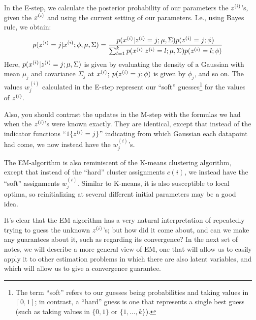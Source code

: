 \documentclass{article}
\begin{document}
In the E-step, we calculate the posterior probability of our parameters
the ${z^{(i)}}$'s, given the ${x^{(i)}}$ and using the current setting of our
parameters.  I.e., using Bayes rule, we obtain:
\[
p({z^{(i)}} = j | {x^{(i)}} ; \phi, \mu, \Sigma) =
\frac{p({x^{(i)}} | {z^{(i)}} = j ; \mu, \Sigma) p({z^{(i)}} = j; \phi)}
{\sum_{l=1}^k p({x^{(i)}} | {z^{(i)}} = l ; \mu, \Sigma) p({z^{(i)}}=l; \phi)}
\]
Here, $p({x^{(i)}} | {z^{(i)}} = j ; \mu, \Sigma)$ is given by evaluating
the density of a Gaussian with mean $\mu_j$ and covariance $\Sigma_j$ at
${x^{(i)}}$; $p({z^{(i)}} = j; \phi)$ is given by $\phi_j$, and so on.
The values $w^{(i)}_j$ calculated in the E-step represent our
``soft'' guesses\footnote{The term ``soft'' refers to our guesses
being probabilities and taking values in $[0,1]$; in contrast,
a ``hard'' guess is one that represents a single best guess (such
as taking values in $\{0,1\}$ or $\{1,\ldots,k\}$).} for the
values of ${z^{(i)}}$.

Also, you should contrast the updates in the M-step with the formulas we
had when the ${z^{(i)}}$'s were known exactly.  They are identical,
except that instead of the indicator functions ``$1\{{z^{(i)}} = j\}$''
indicating from which Gaussian each datapoint had come, we
now instead have the $w^{(i)}_j$'s.

The EM-algorithm is also reminiscent of the K-means clustering
algorithm, except that instead of the ``hard'' cluster assignments
$c(i)$, we instead have the ``soft'' assignments $w^{(i)}_j$.  Similar
to K-means, it is also susceptible to local optima, so reinitializing
at several different initial parameters may be a good idea.

It's clear that the EM algorithm has a very natural interpretation
of repeatedly trying to guess the unknown ${z^{(i)}}$'s; but how did it
come about, and can we make any guarantees about it, such as regarding
its convergence?  In the next set of notes, we will describe a more
general view of EM, one that will allow us to easily apply it to other
estimation problems in which there are also latent variables, and which
will allow us to give a convergence guarantee.












\end{document}
